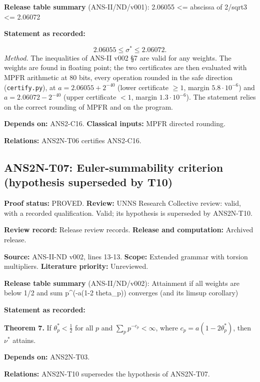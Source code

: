 \documentclass[
  11pt,
]{article}
\begin{document}
\textbf{Release table summary} (ANS-II/ND/v001): 2.06055 \textless=
abscissa of 2/sqrt3 \textless= 2.06072

\textbf{Statement as recorded:}

\[2.06055\le\sigma^\ast\le2.06072 .\] \emph{Method.} The inequalities of
ANS-II v002 §7 are valid for any weights. The weights are found in
floating point; the two certificates are then evaluated with MPFR
arithmetic at 80 bits, every operation rounded in the safe direction
(\texttt{certify.py}), at \(a=2.06055+2^{-40}\) (lower certificate
\(\ge1\), margin \(5.8\cdot10^{-6}\)) and \(a=2.06072-2^{-40}\) (upper
certificate \(<1\), margin \(1.3\cdot10^{-6}\)). The statement relies on
the correct rounding of MPFR and on the program.

\textbf{Depends on:} ANS2-C16. \textbf{Classical inputs:} MPFR directed
rounding.

\textbf{Relations:} ANS2N-T06 certifies ANS2-C16.

\hypertarget{ans2n-t07-euler-summability-criterion-hypothesis-superseded-by-t10}{%
\subsection{ANS2N-T07: Euler-summability criterion (hypothesis
superseded by
T10)}\label{ans2n-t07-euler-summability-criterion-hypothesis-superseded-by-t10}}

\textbf{Proof status:} PROVED. \textbf{Review:} UNNS Research Collective
review: valid, with a recorded qualification. Valid; its hypothesis is
superseded by ANS2N-T10.

\textbf{Review record:} Release review records. \textbf{Release and
computation:} Archived release.

\textbf{Source:} ANS-II-ND v002, lines 13-13. \textbf{Scope:} Extended
grammar with torsion multipliers. \textbf{Literature priority:}
Unreviewed.

\textbf{Release table summary} (ANS-II/ND/v002): Attainment if all
weights are below 1/2 and sum p\^{}(-a(1-2 theta\_p)) converges (and its
limsup corollary)

\textbf{Statement as recorded:}

\textbf{Theorem 7.} If \(\theta^\ast_p<\tfrac12\) for all \(p\) and
\(\sum_pp^{-c_p}<\infty\), where \(c_p=a(1-2\theta^\ast_p)\), then
\(\nu^\ast\) attains.

\textbf{Depends on:} ANS2N-T03.

\textbf{Relations:} ANS2N-T10 supersedes the hypothesis of ANS2N-T07.
\end{document}
